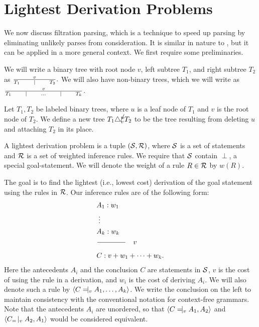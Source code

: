 
\section{Lightest Derivation Problems}

We now discuss filtration parsing, which is a technique to speed up
parsing by eliminating unlikely parses from consideration. It is
similar in nature to \cite{astar}, but it can be applied in a more
general context. We first require some preliminaries.



We will write a binary tree with root node $v$, left subtree $T_1$,
and right subtree $T_2$ as $\frac{v}{T_1 \qquad \mid \qquad T_2}.$ We
will also have non-binary trees, which we will write as
$\frac{v}{T_1 \qquad \mid \qquad \dots \qquad \mid \qquad T_k}$.

\begin{defn}
  Let $T_1, T_2$ be labeled binary trees, where $u$ is a leaf node of
  $T_1$ and $v$ is the root node of $T_2$. We define a new tree $T_1
  \triangle^{\cancel{u}}_v T_2$ to be the tree resulting from deleting
  $u$ and attaching $T_2$ in its place.
\end{defn}

A lightest derivation problem \cite{kld} is a tuple $({\mathcal S},{\mathcal R})$, where ${\mathcal S}$
is a set of statements and ${\mathcal R}$ is a set of weighted inference
rules. We require that ${\mathcal S}$ contain $\perp$, a special
goal-statement. We will denote the weight of a rule $R\in {\mathcal R}$ by
$w(R)$.

The goal is to find the lightest (i.e., lowest cost) derivation of the
goal statement using the rules in ${\mathcal R}$. Our inference rules are of
the following form:
\begin{align*}
&A_1 : w_1\\
&\; \vdots \\
&A_k : w_k\\
&\frac{\qquad \qquad}{\qquad\qquad}\quad v\\
&C : v + w_1 + \dots + w_k.
\end{align*}
Here the antecedents $A_i$ and the conclusion $C$ are statements in
${\mathcal S}$, $v$ is the cost of using the rule in a derivation, and $w_i$
is the cost of deriving $A_i$. We will also denote such a rule by
$\langle C \tne_v A_1, \dots, A_k \rangle$. We write the conclusion on
the left to maintain consistency with the conventional notation for
context-free grammars. Note that the antecedents $A_i$ are unordered,
so that $\langle C\tne_v A_1, A_2 \rangle$ and $\langle C_\tne_v A_2,
A_1 \rangle$ would be considered equivalent.

